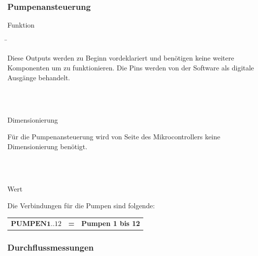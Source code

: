 \subsubsection{Pumpenansteuerung}\label{subsubsec:Pumpenansteuerung_Mikrocontroller}

\begin{tabbing}
\parbox[t]{.25\textwidth}{

Funktion

} \=\parbox[t]{.75\textwidth}{

Diese Outputs werden zu Beginn vordeklariert und benötigen keine weitere Komponenten um zu funktionieren. Die Pins werden von der Software als digitale Ausgänge behandelt.

}\\
\\
\parbox[t]{.25\textwidth}{

Dimensionierung

} \>\parbox[t]{.75\textwidth}{

Für die Pumpenansteuerung wird von Seite des Mikrocontrollers keine Dimensionierung benötigt.

}\\
\\
\parbox[t]{.25\textwidth}{

Wert

} \>\parbox[t]{.75\textwidth}{

Die Verbindungen für die Pumpen sind folgende:

\begin{tabular}{lll}
$\mathbf{PUMPEN1..12}$ & \textbf{=} &  \textbf{Pumpen 1 bis 12} \\
\end{tabular}

}
\end{tabbing}

\subsubsection{Durchflussmessungen}\label{subsubsec:Durchflussmessungen_Mikrocontroller}

